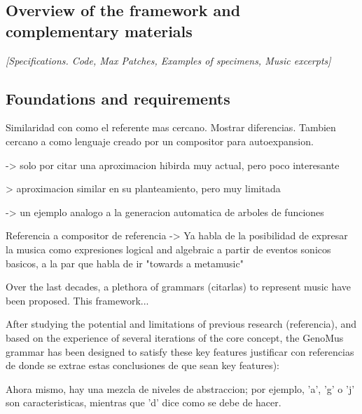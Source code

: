 \documentclass{article}
\begin{document}
\subsection{Overview of the framework and complementary materials}

{\color{gray} \textsl{[Specifications. Code, Max Patches, Examples of specimens, Music excerpts]}}



\subsection{Foundations and requirements}








 



{\color{red}
Similaridad con \cite{Hofmann2015} como el referente mas cercano. Mostrar diferencias. Tambien cercano a \cite{ArizaOpenDesign} como lenguaje creado por un compositor para autoexpansion.

\cite{crawford2015algorithmic} -> solo por citar una aproximacion hibirda muy actual, pero poco interesante

\cite{delaPuente2002} > aproximacion similar en su planteamiento, pero muy limitada

\cite{Laine} -> un ejemplo analogo a la generacion automatica de arboles de funciones

Referencia a compositor de referencia -> \cite{xenakis1971formalized}
Ya habla de la posibilidad de expresar la musica como expresiones logical and algebraic a partir de eventos sonicos basicos, a la par que habla de ir "towards a metamusic" 
}








Over the last decades, a plethora of grammars {\color{red}(citarlas)} to represent music have been proposed. This framework...  

After studying the potential and limitations of previous research {\color{red}(referencia)}, and based on the experience of several iterations of the core concept, the GenoMus grammar has been designed to satisfy these key features {\color{red}justificar con referencias de donde se extrae estas conclusiones de que sean key features)}:

{\color{red}Ahora mismo, hay una mezcla de niveles de abstraccion; por ejemplo, 'a', 'g' o 'j' son caracteristicas, mientras que 'd' dice como se debe de hacer.}
\end{document}

